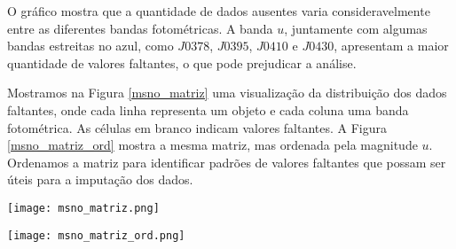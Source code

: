 O gráfico mostra que a quantidade de dados ausentes varia consideravelmente entre as diferentes bandas fotométricas. A banda $u$, juntamente com algumas bandas estreitas no azul, como $J0378$, $J0395$, $J0410$ e $J0430$, apresentam a maior quantidade de valores faltantes, o que pode prejudicar a análise.

Mostramos na Figura \ref{msno_matriz} uma visualização da distribuição dos dados faltantes, onde cada linha representa um objeto e cada coluna uma banda fotométrica. As células em branco indicam valores faltantes. A Figura \ref{msno_matriz_ord} mostra a mesma matriz, mas ordenada pela magnitude $u$. Ordenamos a matriz para identificar padrões de valores faltantes que possam ser úteis para a imputação dos dados.

\begin{center}
    \begin{minipage}{0.45\textwidth}
        \centering
        \texttt{[image: msno\_matriz.png]}
        \captionsetup{}
        \label{msno_matriz}
    \end{minipage}
    \hfill
    \begin{minipage}{0.45\textwidth}
        \centering
        \texttt{[image: msno\_matriz\_ord.png]}
        \captionsetup{}
        \label{msno_matriz_ord}
    \end{minipage}
\end{center}



